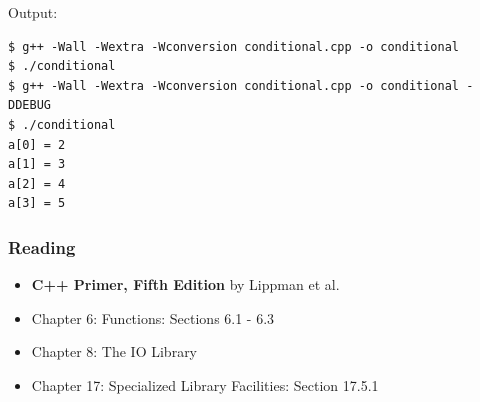 \documentclass[12pt,letterpaper,twoside]{article}
\begin{document}
Output:

\begin{verbatim}
$ g++ -Wall -Wextra -Wconversion conditional.cpp -o conditional
$ ./conditional
$ g++ -Wall -Wextra -Wconversion conditional.cpp -o conditional -DDEBUG
$ ./conditional
a[0] = 2
a[1] = 3
a[2] = 4
a[3] = 5
\end{verbatim}

\subsubsection{Reading}
\begin{itemize}
\item
  \textbf{C++ Primer, Fifth Edition} by Lippman et al.
\item
  Chapter 6: Functions: Sections 6.1 - 6.3
\item
  Chapter 8: The IO Library
\item
  Chapter 17: Specialized Library Facilities: Section 17.5.1
\end{itemize}
\end{document}
